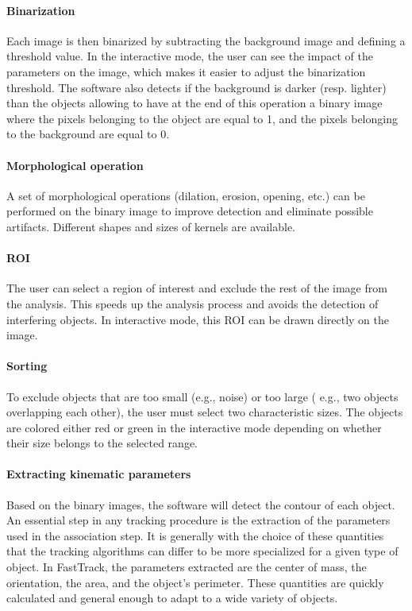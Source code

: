     \paragraph{Binarization}
    Each image is then binarized by subtracting the background image and defining a threshold value. In the interactive mode, the user can see the impact of the parameters on the image, which makes it easier to adjust the binarization threshold. The software also detects if the background is darker (resp. lighter) than the objects allowing to have at the end of this operation a binary image where the pixels belonging to the object are equal to 1, and the pixels belonging to the background are equal to 0.

    \paragraph{Morphological operation}
    A set of morphological operations (dilation, erosion, opening, etc.) can be performed on the binary image to improve detection and eliminate possible artifacts. Different shapes and sizes of kernels are available.

    \paragraph{ROI}
    The user can select a region of interest and exclude the rest of the image from the analysis. This speeds up the analysis process and avoids the detection of interfering objects. In interactive mode, this ROI can be drawn directly on the image.

    \paragraph{Sorting}
    To exclude objects that are too small (e.g., noise) or too large ( e.g., two objects overlapping each other), the user must select two characteristic sizes. The objects are colored either red or green in the interactive mode depending on whether their size belongs to the selected range.

    \paragraph{Extracting kinematic parameters}
    Based on the binary images, the software will detect the contour of each object. An essential step in any tracking procedure is the extraction of the parameters used in the association step. It is generally with the choice of these quantities that the tracking algorithms can differ to be more specialized for a given type of object. In FastTrack, the parameters extracted are the center of mass, the orientation, the area, and the object's perimeter. These quantities are quickly calculated and general enough to adapt to a wide variety of objects.

